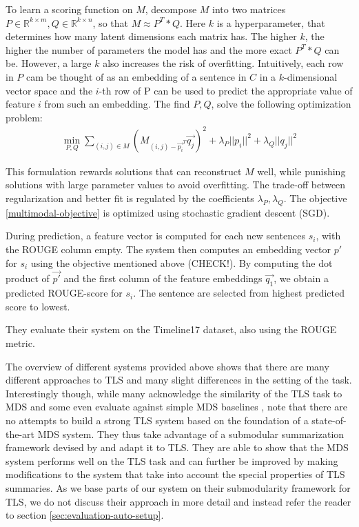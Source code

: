\documentclass[a4paper,BCOR=10mm]{report}
\numberwithin{lemma}{chapter}
\numberwithin{definition}{chapter}
\begin{document}
To learn a scoring function on $M$, \citet{multimodal} decompose $M$ into two matrices $P \in \mathbb{R}^{k \times m}, Q \in \mathbb{R}^{k \times n}$, so that $M \approx P^T * Q$. Here $k$ is a hyperparameter, that determines how many latent dimensions each matrix has. The higher $k$, the higher the number of parameters the model has and the more exact $P^T * Q$ can be. However, a large $k$ also increases the risk of overfitting. Intuitively, each row in $P$ cam be thought of as an embedding of a sentence in $C$ in a $k$-dimensional vector space and the $i$-th row of P can be used to predict the appropriate value of feature $i$ from such an embedding.
The find $P, Q$, \citeauthor{multimodal} solve the following optimization problem:
\begin{align}
\min_{P, Q} \sum_{(i,j) \in M} (M_{(i,j) - \vec{p_i}^T}\vec{q_j})^2 + \lambda_P ||p_i|| ^ 2 + \lambda_Q ||q_j|| ^ 2 \label{multimodal-objective}
\end{align}

This formulation rewards solutions that can reconstruct $M$ well, while punishing solutions with large parameter values to avoid overfitting. The trade-off between regularization and better fit is regulated by the coefficients $\lambda_P, \lambda_Q$.
The objective \ref{multimodal-objective} is optimized using stochastic gradient descent (SGD).

During prediction, a feature vector is computed for each new sentences $s_i$, with the ROUGE column empty. The system then computes an embedding vector $p'$ for $s_i$ using the objective mentioned above (CHECK!). By computing the dot product of $\vec{p'}$ and the first column of the feature embeddings $\vec{q_1}$, we obtain a predicted ROUGE-score for $s_i$.
The sentence are selected from highest predicted score to lowest.

They evaluate their system on the Timeline17 dataset, also using the ROUGE metric.


The overview of different systems provided above shows that there are many different approaches to TLS and many slight differences in the setting of the task. Interestingly though, while many acknowledge the similarity of the TLS task to MDS \citep{yan-trans, headline} and some even evaluate against simple MDS baselines \citep{yan-trans}, \citet{markert} note that there are no attempts to build a strong TLS system based on the foundation of a state-of-the-art MDS system.
They thus take advantage of a submodular summarization framework devised by \citet{lin+bilmes} and adapt it to TLS.
They are able to show that the MDS system performs well on the TLS task and can further be improved by making modifications to the system that take into account the special properties of TLS summaries.
As we base parts of our system on their submodularity framework for TLS, we do not discuss their approach in more detail and instead refer the reader to section \ref{sec:evaluation-auto-setup}.
\end{document}
